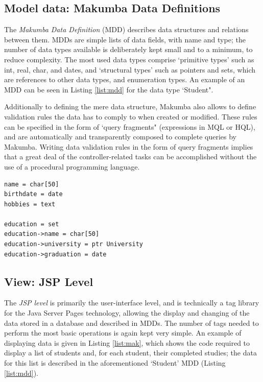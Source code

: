 \documentclass{chi2009}
\begin{document}
\subsection{Model data: Makumba Data Definitions}
The \textit{Makumba Data Definition} (MDD) describes data structures and relations between them. MDDs are simple lists of data fields, with name and type; the number of data types available is deliberately kept small and to a minimum, to reduce complexity. The most used data types comprise `primitive types' such as int, real, char, and dates, and `structural types' such as pointers and sets, which are references to other data types, and enumeration types. An example of an MDD can be seen in Listing \ref{list:mdd} for the data type `Student".

Additionally to defining the mere data structure, Makumba also allows to define validation rules the data has to comply to when created or modified. These rules can be specified in the form of `query fragments" (expressions in MQL or HQL), and are automatically and transparently composed to complete queries by Makumba. Writing data validation rules in the form of query fragments implies that a great deal of the controller-related tasks can be accomplished without the use of a procedural programming language.

\lstset{basicstyle=\small, captionpos=b, caption=Makumba Data Definition "Student", label=list:mdd, frame=shadowbox}
\begin{lstlisting}
name = char[50]
birthdate = date
hobbies = text

education = set
education->name = char[50]
education->university = ptr University
education->graduation = date
\end{lstlisting}

\subsection{View: JSP Level}
The \textit{JSP level} is primarily the user-interface level, and is technically a tag library for the Java Server Pages technology, allowing the display and changing of the data stored in a database and described in MDDs. The number of tags needed to perform the most basic operations is again kept very simple. An example of displaying data is given in Listing \ref{list:mak}, which shows the code required to display a list of students and, for each student, their completed studies; the data for this list is described in the aforementioned `Student' MDD (Listing \ref{list:mdd}).
\end{document}
